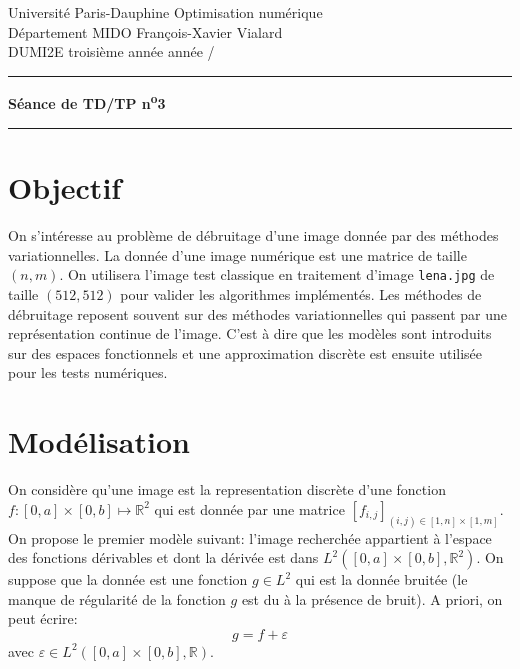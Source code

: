 \documentclass[10pt,a4paper,fleqn]{report}
\makeatletter
\def\cleardoublepage{\clearpage\if@twoside\ifodd\c@page\else\hbox{}\thispagestyle{empty}\newpage\fi\fi}
\newcommand{\R}{\mathbb R}
\makeatother
\begin{document}
\cleardoublepage

\noindent
Universit\'e Paris-Dauphine     \hfill      Optimisation num\'erique\\
D\'epartement MIDO              \hfill      François-Xavier Vialard\\
DUMI2E troisi\`eme ann\'ee      \hfill      ann\'ee /

\medskip

\hrule

\medskip

\begin{center}

\textbf{\huge S\'{e}ance de TD/TP n\textsuperscript{o}3}

\smallskip

\rule{10cm}{0.4pt}

\end{center}


\section*{Objectif}
On s'int\'eresse au probl\`eme de d\'ebruitage d'une image donn\'ee par des m\'ethodes variationnelles. La donn\'ee d'une image num\'erique est une matrice de taille $(n,m)$. On utilisera l'image test classique en traitement d'image \texttt{lena.jpg} de taille $(512,512)$ pour valider les algorithmes impl\'ement\'es. Les m\'ethodes de d\'ebruitage reposent souvent sur des m\'ethodes variationnelles qui passent par une repr\'esentation continue de l'image. C'est \`a dire que les mod\`eles sont introduits sur des espaces fonctionnels et une approximation discr\`ete est ensuite utilis\'ee pour les tests num\'eriques.


\section{Mod\'elisation}

On consid\`ere qu'une image est la representation discr\`ete d'une fonction $f:[0,a]\times[0,b] \mapsto \R^2$ qui est donn\'ee par une matrice $[f_{i,j}]_{(i,j)\in [1,n]\times[1,m]}$.
On propose le premier mod\`ele suivant: l'image recherch\'ee appartient \`a l'espace des fonctions d\'erivables et dont la d\'eriv\'ee est dans $L^2([0,a]\times[0,b],\R^2)$. On suppose que la donn\'ee est une fonction $g \in L^2$ qui est la donn\'ee bruit\'ee (le manque de r\'egularit\'e de la fonction $g$ est du \`a la pr\'esence de bruit). A priori, on peut \'ecrire:
\begin{equation}
g = f+ \varepsilon 
\end{equation}
avec $\varepsilon \in L^2([0,a]\times[0,b],\R) $.
\end{document}
